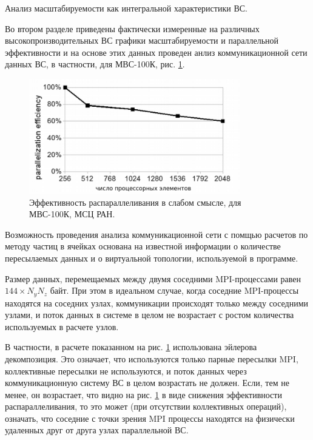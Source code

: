 {Анализ масштабируемости как интегральной характеристики ВС.}

Во втором разделе приведены фактически измеренные на различных высокопроизводительных ВС графики масштабируемости и параллельной эффективности и на основе этих данных проведен анлиз коммуникационной сети данных ВС, в частности, для МВС-100К, рис. \ref{eff2}. 

\begin{figure}[h]
	\begin{center}
		\includegraphics[height=5cm,keepaspectratio]{images/eff_weak_JSCC.png}
		\caption{
			Эффективность распараллеливания в слабом смысле, для МВС-100К, МСЦ РАН.
		}
		\label{eff2}
	\end{center} 
\end{figure}

Возможность проведения анализа коммуникационной сети с помщью расчетов по методу частиц в ячейках основана на известной информации о количестве пересылаемых данных и о виртуальной топологии, используемой в программе.

Размер данных, перемещаемых между двумя соседними MPI-процессами равен $144 \times N_y N_z  $ байт. При этом в идеальном случае, когда соседние MPI-процессы находятся на соседних узлах, коммуникации происходят только между соседними узлами, и поток данных в системе в целом не возрастает с ростом количества используемых в расчете узлов.

В частности, в расчете показанном на рис. \ref{eff2} использована эйлерова декомпозиция. Это означает, что используются только парные пересылки MPI, коллективные пересылки не используются, и поток данных через коммуникационную систему ВС в целом возрастать не должен. Если, тем не менее, он возрастает, что видно на рис. \ref{eff2} в виде снижения эффективности распараллеливания, то это может (при отсутствии коллективных операций), означать, что соседние с точки зрения MPI процессы находятся на физически удаленных друг от друга узлах параллельной ВС.

